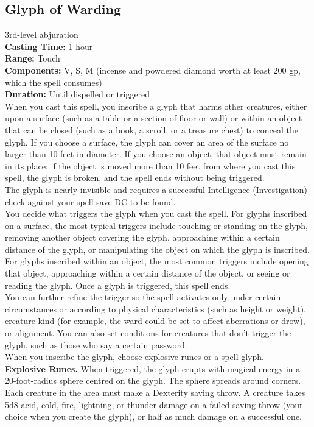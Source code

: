 \documentclass[11pt, A4paper, english]{article}
\begin{document}
		\subsection{Glyph of Warding}
3rd-level abjuration \\
\textbf{Casting Time:} 1 hour \\
\textbf{Range:} Touch \\
\textbf{Components:} V, S, M (incense and powdered diamond worth at least 200 gp, which the spell consumes) \\
\textbf{Duration:} Until dispelled or triggered \\
When you cast this spell, you inscribe a glyph that harms other creatures, either upon a surface (such as a table or a section of floor or wall) or within an object that can be closed (such as a book, a scroll, or a treasure chest) to conceal the glyph. If you choose a surface, the glyph can cover an area of the surface no larger than 10 feet in diameter. If you choose an object, that object must remain in its place; if the object is moved more than 10 feet from where you cast this spell, the glyph is broken, and the spell ends without being triggered. \\
The glyph is nearly invisible and requires a successful Intelligence (Investigation) check against your spell save DC to be found. \\
You decide what triggers the glyph when you cast the spell. For glyphs inscribed on a surface, the most typical triggers include touching or standing on the glyph, removing another object covering the glyph, approaching within a certain distance of the glyph, or manipulating the object on which the glyph is inscribed. For glyphs inscribed within an object, the most common triggers include opening that object, approaching within a certain distance of the object, or seeing or reading the glyph. Once a glyph is triggered, this spell ends. \\
You can further refine the trigger so the spell activates only under certain circumstances or according to physical characteristics (such as height or weight), creature kind (for example, the ward could be set to affect aberrations or drow), or alignment. You can also set conditions for creatures that don’t trigger the glyph, such as those who say a certain password. \\
When you inscribe the glyph, choose explosive runes or a spell glyph. \\
\textbf{Explosive Runes.} When triggered, the glyph erupts with magical energy in a 20-foot-radius sphere centred on the glyph. The sphere spreads around corners. Each creature in the area must make a Dexterity saving throw. A creature takes 5d8 acid, cold, fire, lightning, or thunder damage on a failed saving throw (your choice when you create the glyph), or half as much damage on a successful one. \\
\end{document}
